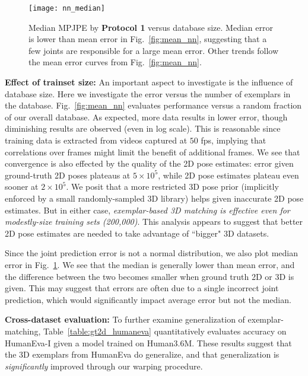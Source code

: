 \documentclass[10pt,twocolumn,letterpaper]{article}
\begin{document}
\begin{figure}[t!]
\centering
\texttt{[image: nn\_median]}
   \caption{Median MPJPE by \textbf{Protocol 1} versus database size. Median error is lower than mean error in Fig.~\ref{fig:mean_nn}, suggesting that a few joints are responsible for a large mean error. Other trends follow the mean error curves from Fig.~\ref{fig:mean_nn}.}
\label{fig:median_nn}
\end{figure}

{\bf Effect of trainset size:} An important aspect to investigate is the influence of database size. Here we investigate the error versus the number of exemplars in the database. Fig.~\ref{fig:mean_nn} evaluates performance versus a random fraction of our overall database. As expected, more data results in lower error, though diminishing results are observed (even in log scale). This is reasonable since training data is extracted from videos captured at $50$ fps, implying that correlations over frames might limit the benefit of additional frames. We see that convergence is also effected by the quality of the 2D pose estimates: error given ground-truth 2D poses plateaus at $5\times10^5$, while 2D pose estimates plateau even sooner at $2\times10^5$. We posit that a more restricted 3D pose prior (implicitly enforced by a small randomly-sampled 3D library) helps given inaccurate 2D pose estimates. But in either case, {\em exemplar-based 3D matching is effective even for modestly-size training sets (200,000)}. This analysis appears to suggest that better 2D pose estimates are needed to take advantage of ``bigger" 3D datasets.


Since the joint prediction error is not a normal distribution, we also plot median error in Fig.~\ref{fig:median_nn}.
We see that the median is generally lower than mean error, and the difference between the two becomes smaller when ground truth 2D or 3D is given. This may suggest that errors are often due to a single incorrect joint prediction, which would significantly impact average error but not the median.


{\bf Cross-dataset evaluation:} To further examine generalization of exemplar-matching, Table~\ref{table:gt2d_humaneva} quantitatively evaluates accuracy on HumanEva-I \cite{sigal2010humaneva} given a model trained on Human3.6M. These results suggest that the 3D exemplars from HumanEva do generalize, and that generalization is {\em significantly} improved through our warping procedure.
\end{document}
